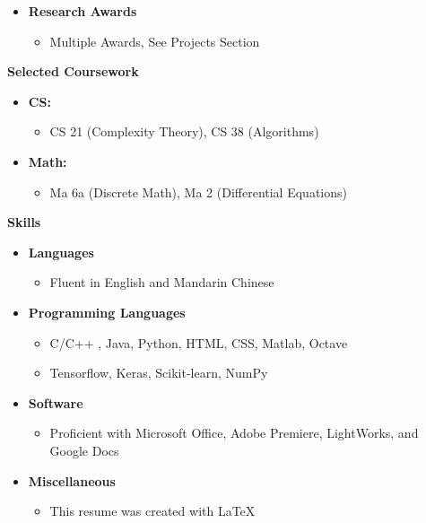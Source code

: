 \documentclass[letterpaper,11pt]{article}
\newcommand{\resheading}[1]{{\large \colorbox{mygrey}{\begin{minipage}{\textwidth}{\textbf{#1 \vphantom{p\^{E}}}}\end{minipage}}}}
\newcommand{\myitem}[1]{\item #1 \vspace{-9pt}}
\newcommand{\mysubitem}[1]{\item #1 \vspace{-4pt}}
\begin{document}
\begin{itemize}
		\myitem {\textbf{Research Awards}}
			\begin{itemize}
				\mysubitem {Multiple Awards, See Projects Section}
			\end{itemize} \vspace{-3pt}
			
	\end{itemize}

\resheading{Selected Coursework}
	\begin{itemize}
		\myitem{\textbf{CS:}}
			\begin{itemize}
				\mysubitem {CS 21 (Complexity Theory), CS 38 (Algorithms)}
			\end{itemize}
		\myitem{\textbf{Math:}}
			\begin{itemize}
				\mysubitem {Ma 6a (Discrete Math), Ma 2 (Differential Equations)}
			\end{itemize}
	\end{itemize}
\resheading{Skills}
	\begin{itemize}
		\myitem {\textbf{Languages}}
			\begin{itemize}
				\mysubitem {Fluent in English and Mandarin Chinese}
			\end{itemize} \vspace{-9pt}
		\myitem {\textbf{Programming Languages}}
			\begin{itemize}
				\mysubitem {C/C++ , Java, Python, HTML, CSS, Matlab, Octave}
				\mysubitem {Tensorflow, Keras, Scikit-learn, NumPy}
			\end{itemize} \vspace{-9pt}
		\myitem {\textbf{Software}}
			\begin{itemize}
				\mysubitem {Proficient with Microsoft Office, Adobe Premiere, LightWorks, and Google Docs}
			\end{itemize} \vspace{-9pt}
		\myitem {\textbf{Miscellaneous}}
			\begin{itemize}
				\mysubitem {This resume was created with \LaTeX}
			\end{itemize} \vspace{-9pt}
	\end{itemize}

\vspace{-6pt}
\end{document}
